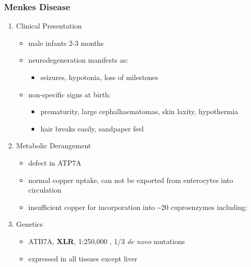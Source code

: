 \documentclass{scrartcl}
\begin{document}
\subsubsection{Menkes Disease}
\label{sec:orgb83d3d7}
\begin{enumerate}
\item Clinical Presentation
\label{sec:org5b1e5d1}
\begin{itemize}
\item male infants 2-3 months
\item neurodegeneration manifests as:
\begin{itemize}
\item seizures, hypotonia, loss of milestones
\end{itemize}
\item non-specific signs at birth:
\begin{itemize}
\item prematurity, large cephalhaematomas, skin laxity, hypothermia
\item hair breaks easily, sandpaper feel
\end{itemize}
\end{itemize}

\item Metabolic Derangement
\label{sec:org353320f}
\begin{itemize}
\item defect in ATP7A
\item normal copper uptake, can not be exported from enterocytes into circulation
\item insufficient copper for incorporation into \textasciitilde{}20 cuproenzymes including:
\end{itemize}

\item Genetics
\label{sec:org64fac5a}
\begin{itemize}
\item ATB7A, \textbf{XLR}, 1:250,000 , 1/3 \emph{de novo} mutations
\item expressed in all tissues except liver
\end{itemize}


\end{enumerate}
\end{document}
